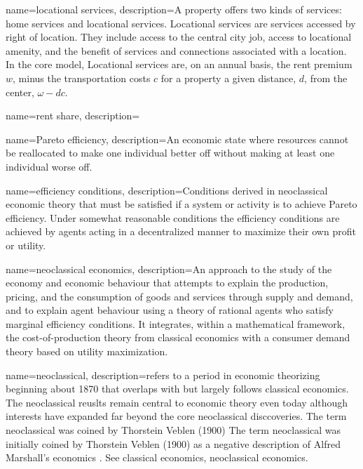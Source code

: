 {
name=locational services,
description={A property offers two kinds of services: \gls{home services} and locational services. Locational services are services accessed by right of location. They include access to the central city job, access to locational amenity, and the benefit of services and connections associated with a location. In the core model, Locational services are, on an annual basis, the rent premium $w$, minus the transportation costs $c$ for a property a given distance, $d$, from the center, $\omega- {dc}$.}
}

{
name=rent share,
description={}
}

{
name=Pareto efficiency,
description={An economic state where resources cannot be reallocated to make one individual better off without making at least one individual worse off.}
}

{
name=efficiency conditions,
description={Conditions derived in neoclassical economic theory that must be satisfied if a system or activity is to achieve Pareto efficiency. Under somewhat reasonable conditions the efficiency conditions are achieved by agents acting in a decentralized manner to maximize their own profit or utility.}
}

{
name=neoclassical economics,
description={An approach to the study of the economy and economic behaviour that attempts to explain the production, pricing, and the consumption of goods and services through supply and demand, and to explain agent behaviour using a theory of rational agents who satisfy \gls{marginal} efficiency conditions. It integrates, within a mathematical framework, the cost-of-production theory from classical economics with a consumer demand theory based on utility maximization.}
}


{
name=neoclassical,
description={refers to a period in economic  theorizing beginning about 1870 that overlaps with  but largely follows classical economics. The neoclassical reuslts remain central to economic theory even today although interests have expanded far beyond the core neoclassical disccoveries. The term neoclassical was  coined by Thorstein Veblen (1900) The term neoclassical was initially coined by Thorstein Veblen (1900) as a negative description of Alfred Marshall's economics \cite{colanderDeathNeoclassicalEconomics2000}. See \gls{classical economics},  \gls{neoclassical economics}. }
}


